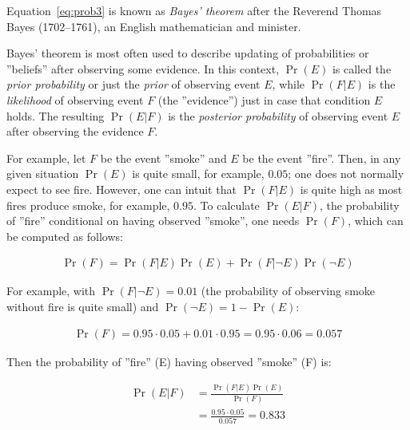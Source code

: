 \begin{infobox}
Equation~\ref{eq:prob3} is known as \emph{Bayes' theorem} after the Reverend Thomas Bayes (1702--1761), an English mathematician and minister. 

\vspace{.5\baselineskip}
Bayes' theorem is most often used to describe updating of probabilities or ''beliefs'' after observing some evidence. In this context, $\operatorname*{Pr}(E)$ is called the \emph{prior probability} or just the \emph{prior} of observing event $E$, while $\operatorname*{Pr}(F | E)$ is the \emph{likelihood} of observing event $F$ (the ''evidence'') just in case that condition $E$ holds. The resulting $\operatorname*{Pr}(E | F)$ is the \emph{posterior probability} of observing event $E$ after observing the evidence $F$. 
\end{infobox}

For example, let $F$ be the event ''smoke'' and $E$ be the event ''fire''. Then, in any given situation $\operatorname*{Pr}(E)$ is quite small, for example, $0.05$; one does not normally expect to see fire. However, one can intuit that $\operatorname*{Pr}(F | E)$ is quite high as most fires produce smoke, for example, $0.95$. To calculate $\operatorname*{Pr}(E | F)$, the probability of ''fire'' conditional on having observed ''smoke'', one needs $\operatorname*{Pr}(F)$, which can be computed as follows:

\begin{align*}
\operatorname*{Pr}(F) = \operatorname*{Pr}(F | E) \operatorname*{Pr}(E) + \operatorname*{Pr}(F | \neg E)\operatorname*{Pr}(\neg E)
\end{align*}

For example, with $\operatorname*{Pr}(F | \neg E) = 0.01$ (the probability of observing smoke without fire is quite small) and $\operatorname*{Pr}(\neg E) = 1 - \operatorname*{Pr}(E)$:

\begin{align*}
\operatorname*{Pr}(F) = 0.95 \cdot 0.05 + 0.01 \cdot 0.95 = 0.95 \cdot 0.06 = 0.057
\end{align*}

Then the probability of ''fire'' (E) having observed ''smoke'' (F) is:

\begin{align*}
\operatorname*{Pr}(E | F) &= \frac{\operatorname*{Pr}(F | E) \operatorname*{Pr}(E)}{\operatorname*{Pr}(F)} \\
&= \frac{0.95 \cdot 0.05}{0.057} = 0.833
\end{align*}


